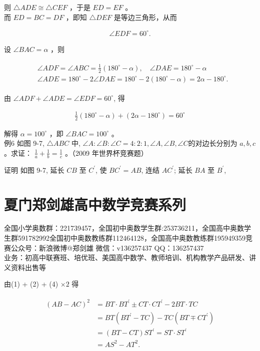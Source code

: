 \documentclass[10pt]{article}
\begin{document}
则 $\triangle A D E \cong \triangle C E F$ ，于是 $E D=E F$ 。\\
而 $E D=B C=D F$ ，即知 $\triangle D E F$ 是等边三角形，从而

\begin{align*}
\angle E D F=60^{\circ} .
\end{align*}

设 $\angle B A C=\alpha$ ，则

\begin{align*}
\begin{aligned}
& \angle A D F=\angle A B C=\frac{1}{2}\left(180^{\circ}-\alpha\right), \quad \angle D A E=180^{\circ}-\alpha \\
& \angle A D E=180^{\circ}-2 \angle D A E=180^{\circ}-2\left(180^{\circ}-\alpha\right)=2 \alpha-180^{\circ} .
\end{aligned}
\end{align*}

由 $\angle A D F+\angle A D E=\angle E D F=60^{\circ}$, 得

\begin{align*}
\frac{1}{2}\left(180^{\circ}-\alpha\right)+\left(2 \alpha-180^{\circ}\right)=60^{\circ}
\end{align*}

解得 $\alpha=100^{\circ}$ ，即 $\angle B A C=100^{\circ}$ 。\\
例6 如图 9-7, $\triangle A B C$ 中, $\angle A: \angle B: \angle C=4: 2: 1, \angle A, \angle B, \angle C$的对边长分别为 $a, b, c$ 。求证： $\frac{1}{a}+\frac{1}{b}=\frac{1}{c}$ 。（2009 年世界杯竞赛题）

证明 如图 9-7, 延长 $C B$ 至 $C^{\prime}$, 使 $B C^{\prime}=A B$, 连结 $A C^{\prime}$; 延长 $B A$ 至 $B^{\prime}$,

\section*{夏门郑剑雄高中数学竞赛系列}
全国小学奥数群：221739457，全国初中奥数学生群:253736211，全国高中奥数学生群591782992全国初中奥数教练群112464128，全国高中奥数教练群195949359竞赛公众号：新浪微博@郑剑雄 微信：v136257437 QQ：136257437\\
业务：初高中联赛班、培优班、美国高中数学、教师培训、机构教学产品研发、讲义资料出售等

由(1) + (2) + (4) $\times 2$ 得

\begin{align*}
\begin{aligned}
(A B-A C)^{2} & =B T \cdot B T^{\prime} \pm C T \cdot C T^{\prime}-2 B T \cdot T C \\
& =B T\left(B T^{\prime}-T C\right)-T C\left(B T \mp C T^{\prime}\right) \\
& =(B T-C T) S T^{\prime}=S T \cdot S T^{\prime} \\
& =A S^{2}-A T^{2} .
\end{aligned}
\end{align*}
\end{document}
